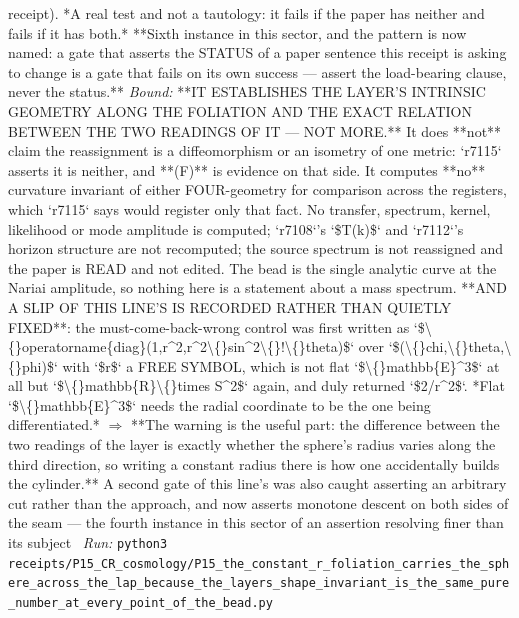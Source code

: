 \begin{description}
receipt). *A real test and not a tautology: it fails if the paper has neither and fails if it has both.*  **Sixth instance in this sector, and the pattern is now named: a gate that asserts the STATUS of a paper sentence this receipt is asking to change is a gate that fails on its own success --- assert the load-bearing clause, never the status.**
 \emph{Bound:}  **IT ESTABLISHES THE LAYER'S INTRINSIC GEOMETRY ALONG THE FOLIATION AND THE EXACT RELATION BETWEEN THE TWO READINGS OF IT --- NOT MORE.**  It does **not** claim the reassignment is a diffeomorphism or an isometry of one metric: `r7115` asserts it is neither, and **(F)** is evidence on that side. It computes **no** curvature invariant of either FOUR-geometry for comparison across the registers, which `r7115` says would register only that fact. No transfer, spectrum, kernel, likelihood or mode amplitude is computed; `r7108`'s `\$T(k)\$` and `r7112`'s horizon structure are not recomputed; the source spectrum is not reassigned and the paper is READ and not edited.  The bead is the single analytic curve at the Nariai amplitude, so nothing here is a statement about a mass spectrum.  **AND A SLIP OF THIS LINE'S IS RECORDED RATHER THAN QUIETLY FIXED**: the must-come-back-wrong control was first written as `\$\textbackslash\{\}operatorname\{diag\}(1,r\textasciicircum{}2,r\textasciicircum{}2\textbackslash\{\}sin\textasciicircum{}2\textbackslash\{\}!\textbackslash\{\}theta)\$` over `\$(\textbackslash\{\}chi,\textbackslash\{\}theta,\textbackslash\{\}phi)\$` with `\$r\$` a FREE SYMBOL, which is not flat `\$\textbackslash\{\}mathbb\{E\}\textasciicircum{}3\$` at all but `\$\textbackslash\{\}mathbb\{R\}\textbackslash\{\}times S\textasciicircum{}2\$` again, and duly returned `\$2/r\textasciicircum{}2\$`. *Flat `\$\textbackslash\{\}mathbb\{E\}\textasciicircum{}3\$` needs the radial coordinate to be the one being differentiated.* \ensuremath{\Rightarrow} **The warning is the useful part: the difference between the two readings of the layer is exactly whether the sphere's radius varies along the third direction, so writing a constant radius there is how one accidentally builds the cylinder.**  A second gate of this line's was also caught asserting an arbitrary cut rather than the approach, and now asserts monotone descent on both sides of the seam --- the fourth instance in this sector of an assertion resolving finer than its subject
\ \emph{Run:} \texttt{python3 receipts/P15\_CR\_cosmology/P15\_the\_constant\_r\_foliation\_carries\_the\_sphere\_across\_the\_lap\_because\_the\_layers\_shape\_invariant\_is\_the\_same\_pure\_number\_at\_every\_point\_of\_the\_bead.py}

\end{description}
